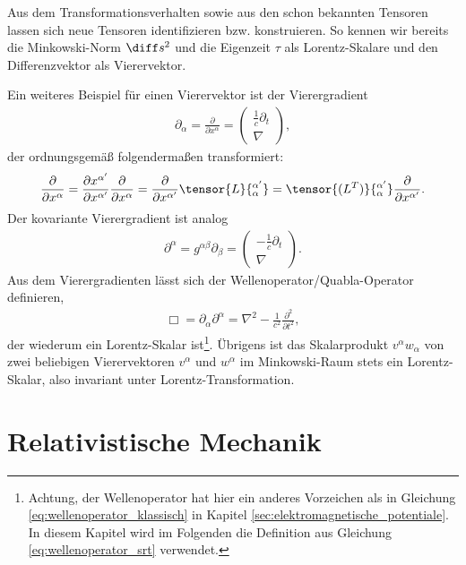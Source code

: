 Aus dem Transformationsverhalten sowie aus den schon bekannten Tensoren lassen sich neue Tensoren identifizieren bzw. konstruieren.
So kennen wir bereits die Minkowski-Norm $\diff s^2$ und die Eigenzeit $\tau$ als Lorentz-Skalare und den Differenzvektor als Vierervektor.

Ein weiteres Beispiel für einen Vierervektor ist der Vierergradient
\begin{align*}
    \partial_\alpha=\frac{\partial}{\partial x^\alpha}=\begin{pmatrix}\frac{1}{c}\partial_t\\ \nabla \end{pmatrix},
\end{align*}
der ordnungsgemäß folgendermaßen transformiert:
\begin{align*}
    \frac{\partial}{\partial x^\alpha}=\frac{\partial x^{\alpha'}}{\partial x^{\alpha'}}\frac{\partial}{\partial x^\alpha}=\frac{\partial}{\partial x^{\alpha'}} \tensor{L}{^{\alpha'}_\alpha}=\tensor{(L^T)}{_\alpha^{\alpha'}}\frac{\partial}{\partial x^{\alpha'}}.
\end{align*}
Der kovariante Vierergradient ist analog
\begin{align*}
    \partial^\alpha=g^{\alpha\beta}\partial_\beta=\begin{pmatrix}-\frac{1}{c}\partial_t\\ \nabla \end{pmatrix}.
\end{align*}
Aus dem Vierergradienten lässt sich der Wellenoperator/Quabla-Operator definieren,
\begin{align}
    \label{eq:wellenoperator_srt}
    \Box =\partial_\alpha\partial^\alpha =\nabla^2-\frac{1}{c^2} \frac{\partial^2}{\partial t^2},
\end{align}
der wiederum ein Lorentz-Skalar ist\footnote{Achtung, der Wellenoperator hat hier ein anderes Vorzeichen als in Gleichung
    \eqref{eq:wellenoperator_klassisch} in Kapitel \ref{sec:elektromagnetische_potentiale}. In diesem Kapitel wird im Folgenden die Definition aus Gleichung \eqref{eq:wellenoperator_srt} verwendet. }.
Übrigens ist das Skalarprodukt $v^\alpha w_\alpha$ von zwei beliebigen Vierervektoren $v^\alpha$ und $w^\alpha$ im Minkowski-Raum stets ein Lorentz-Skalar, also invariant unter Lorentz-Transformation.



\section{Relativistische Mechanik}

